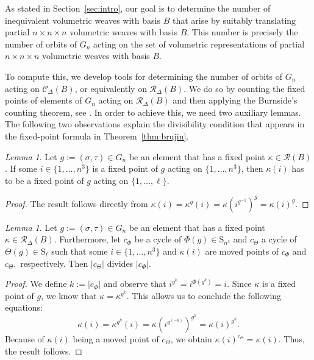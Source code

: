 \documentclass[12pt]{article}
\theoremstyle{definition}
\theoremstyle{remark}
\newtheorem{lemma}[theorem]{Lemma}
\begin{document}
As stated in Section~\ref{sec:intro}, our goal is to determine the number of inequivalent volumetric weaves with basis $B$ that arise by suitably translating partial $n \times n \times n$ volumetric weaves with basis $B$. This number is precisely the number of orbits of $G_n$ acting on the set of volumetric representations of partial $n \times n \times n$ volumetric weaves with basis $B$.

To compute this, we develop tools for determining the number of orbits of $G_n$ acting on $\mathcal{C}_\Delta(B)$, or equivalently on $\mathcal{R}_{\Delta}(B)$. We do so by counting the fixed points of elements of $G_n$ acting on $\mathcal{R}_{\Delta}(B)$ and then applying the Burnside's counting theorem, see \cite{MR69818}. In order to achieve this, we need two auxiliary lemmas. The following two observations explain the divisibility condition that appears in the fixed-point formula in Theorem~\ref{thm:brujin}.


\begin{lemma}
    Let $g:=(\sigma,\tau)\in G_n$ be an element that has a fixed point $\kappa\in \mathcal{R}(B)$. If some $i\in \{1,\ldots,n^3\}$ is a fixed point of $g$ acting on $\{1,\ldots,n^3\}$, then $\kappa(i)$ has to be a fixed point of $g$ acting on $\{1,\ldots,\ell\}.$
\end{lemma}
\begin{proof}
The result follows directly from
       $\kappa(i)=\kappa^{g}(i)=\kappa(i^{g^{-1}})^{g}=\kappa(i)^{g}.$
\end{proof}
\begin{lemma}
    Let $g:=(\sigma,\tau)\in G_n$ be an element that has a fixed point $\kappa\in \mathcal{R}_\Delta(B)$. Furthermore, let $c_\Phi$ be a cycle of $\Phi(g)\in \mathrm{S}_{n^3}$ and $c_\Theta$ a cycle of $\Theta(g) \in \mathrm{S}_\ell$ such that some $i\in \{1,\ldots,n^3\}$ and $\kappa(i)$ are moved points of $c_\Phi$ and $c_\Theta,$ respectively. Then $\vert c_\Theta\vert $ divides $\vert c_\Phi\vert$.
\end{lemma}
\begin{proof}
   We define $k:=\vert c_\Phi\vert$ and observe that $i^{g^k}=i^{\Phi(g^k)}=i$. Since $\kappa$ is a fixed point of $g$, we know that $\kappa=\kappa^{g^k}$. This allows us to conclude the following equations:
   $$\kappa(i)=\kappa^{g^k}(i)=\kappa(i^{g^{(-k)}})^{g^k}=\kappa(i)^{g^k}.$$
   Because of $\kappa(i)$ being a moved point of $c_\Theta$, we obtain ${\kappa(i)}^{c_\Theta}=\kappa(i)$. Thus, the result follows.
\end{proof}
\end{document}
